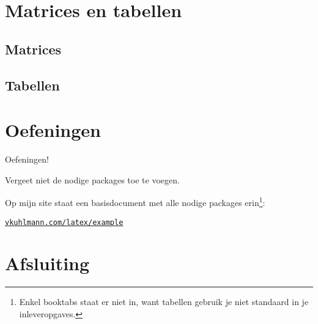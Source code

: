 \documentclass[
    dutch,
    everyoneauthor=true,
    darktheme,
    defaultSlideCollection=vincent,
    slidenames=true
]{../../cursuspresentatie}
\begin{document}
\section{Matrices en tabellen}\label{sec:matrices}

\hypertarget{matrices}{}

\subsection{Matrices}


\subsection{Tabellen}


\section{Oefeningen}\label{sec:oefeningen2}

\hypertarget{oefeningen2}{}

\begin{frame}
    \begin{center}
        {\LARGE Oefeningen!}
        \vspace{30pt}

        Vergeet niet de nodige packages toe te voegen.
        
        Op mijn site
        staat een basisdocument met alle nodige packages erin\footnote{Enkel
        booktabs staat er niet in, want tabellen gebruik je niet standaard in je
        inleveropgaves.}:

        \href{https://vkuhlmann.com/latex/example}{\nolinkurl{vkuhlmann.com/latex/example}}
    \end{center}
\end{frame}

\section{Afsluiting}
\end{document}
